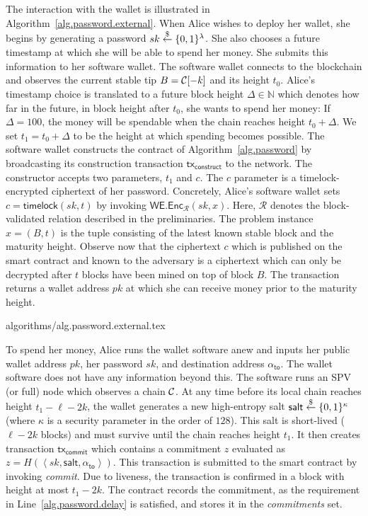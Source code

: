 The interaction with the wallet is illustrated in Algorithm~\ref{alg.password.external}.
When Alice wishes to deploy her wallet, she
begins by generating a password $sk \overset{\$}{\gets} \{0, 1\}^\lambda$. She also chooses
a future timestamp at which she will be able to spend her money.
She submits this information to her
software wallet.
The software wallet connects to
the blockchain and observes the current stable tip $B = \mathcal{C}[-k]$
and its height $t_0$.
Alice's timestamp choice is translated to a future block height $\Delta \in \mathbb{N}$ which
denotes how far in the future,
in block height after $t_0$, she wants to spend her money: If $\Delta = 100$, the money will
be spendable when the chain reaches height $t_0 + \Delta$.
We set $t_1 = t_0 + \Delta$ to be the height at which spending becomes possible.
The software wallet constructs the contract of Algorithm~\ref{alg.password}
by broadcasting its construction transaction $\textsf{tx}_\textsf{construct}$
to the network.
The constructor accepts two parameters, $t_1$
and $c$. The $c$ parameter is a timelock-encrypted
ciphertext of her password. Concretely, Alice's software wallet
sets $c = \textsf{timelock}(sk, t)$ by invoking $\textsf{WE.Enc}_\mathcal{R}(sk, x)$.
Here, $\mathcal{R}$ denotes the block-validated relation described in the preliminaries.
The problem instance $x = (B, t)$
is the tuple consisting of the latest known stable block and the maturity height.
Observe now that the ciphertext $c$ which is published on the
smart contract and known to the adversary is a ciphertext which can only be decrypted
after $t$ blocks have been mined on top of block $B$. The transaction returns a wallet address $pk$
at which she can receive money prior to the maturity height.

{algorithms/alg.password.external.tex}

To spend her money, Alice runs the wallet software anew and inputs her public wallet address $pk$,
her password $sk$, and destination address $\alpha_{\textsf{to}}$. The wallet software does not have any information beyond this.
The software runs an SPV (or full) node which observes a chain $\mathcal{C}$.
At any time before its local chain reaches height $t_1 - \ell - 2k$,
the wallet generates a new high-entropy salt $\textsf{salt} \overset{\$}{\gets} \{0, 1\}^\kappa$ (where $\kappa$
is a security parameter in the order of $128$). This salt
is short-lived ($\ell - 2k$ blocks) and must survive until the chain reaches height $t_1$.
It then creates transaction $\textsf{tx}_\textsf{commit}$ which
contains
a commitment $z$ evaluated as $z = H(\left<sk, \textsf{salt}, \alpha_{\textsf{to}}\right>)$.
This transaction is submitted to the smart contract by invoking \emph{commit}.
Due to liveness, the transaction is confirmed in a block with
height at most $t_1 - 2k$. The contract records the commitment, as the requirement
in Line~\ref{alg.password.delay} is satisfied, and stores it in the \emph{commitments} set.

